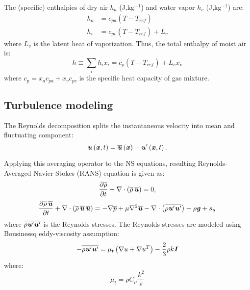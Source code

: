 The (specific) enthalpies of dry air $h_a$ (J,kg$^{-1}$) and water vapor $h_v$ (J,kg$^{-1}$) are:
\begin{align}
h_a &= c_{pa} \left(T - T_{\mathit{ref}}\right) \\
h_v &= c_{pv} \left(T - T_{\mathit{ref}}\right) + L_v
\end{align}
where $L_v$ is the latent heat of vaporization. Thus, the total enthalpy of moist air is:
\begin{equation}
h \equiv \sum_i h_i x_i = c_p \left(T - T_{\mathit{ref}}\right) + L_v x_v
\end{equation}
where $c_p = x_a c_{\textit{pa}} +  x_v c_{\textit{pv}}$ is the specific heat capacity of gas mixture.

\subsection*{Turbulence modeling}

The Reynolds decomposition splits the instantaneous velocity into mean and fluctuating component:
\begin{equation}
\textbf{\textit{u}} \left(\textbf{\textit{x}},t\right) = \overline{\textbf{\textit{u}}} \left(\textbf{\textit{x}}\right) + \textbf{\textit{u}}' \left(\textbf{\textit{x}},t\right).
\end{equation}

Applying this averaging operator to the NS equations, resulting Reynolds-Averaged Navier-Stokes (RANS) equation is given as:
\begin{equation}
\frac{\partial \overline{\rho}}{\partial t} + \nabla \cdot \left(\overline{\rho}\,\overline{\textbf{\textit{u}}}\right) = 0,
\end{equation}
\begin{equation}
\frac{\partial \overline{\rho}\,\overline{\textbf{\textit{u}}}}{\partial t}  + \nabla \cdot \left(\overline{\rho}\,\overline{\textbf{\textit{u}}}\,\overline{\textbf{\textit{u}}}\right) = -\nabla \overline{p} + \mu \nabla^2 \overline{\textbf{\textit{u}}} - \nabla \cdot \left(\overline{\rho \textbf{\textit{u}}' \textbf{\textit{u}}'}\right)+ \rho \textbf{\textit{g}} + s_u
\end{equation}
where $\overline{\rho \textbf{\textit{u}}' \textbf{\textit{u}}'}$ is the Reynolds stresses. The Reynolds stresses are modeled using Bousinessq eddy-viscosity assumption:
\begin{equation}
- \overline{\rho \textbf{\textit{u}}' \textbf{\textit{u}}'} = \mu_t \left(\nabla u + \nabla u^T\right) - \frac{2}{3}\rho k \textbf{\textit{I}}
\end{equation}
where:
\begin{equation}
\mu_t = \rho C_\mu \frac{k^2}{\varepsilon}
\end{equation}

